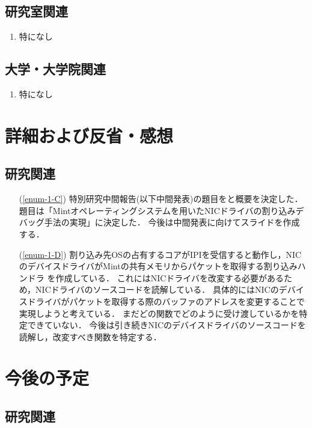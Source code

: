 \documentclass[fleqn, 14pt]{extarticle}
\begin{document}
\subsection{研究室関連}
\label{sec-2-2}
\begin{enumerate}
\item 特になし
\hfill
\end{enumerate}
\subsection{大学・大学院関連}
\label{sec-2-3}

\begin{enumerate}
\item 特になし
\hfill
\label{enum-univ2}
\end{enumerate}





\section{詳細および反省・感想}
\label{sec-3}
\subsection{研究関連}
\label{sec-3-1}

\begin{itemize}
\item[(\ref{enum-1-C})]
特別研究中間報告(以下中間発表)の題目をと概要を決定した．
題目は「Mintオペレーティングシステムを用いたNICドライバの割り込みデバッグ手法の実現」に決定した．
今後は中間発表に向けてスライドを作成する．
\item[(\ref{enum-1-D})]
割り込み先OSの占有するコアがIPIを受信すると動作し，NICのデバイスドライバがMintの共有メモリからパケットを取得する割り込みハンドラ
を作成している．
これにはNICドライバを改変する必要があるため，NICドライバのソースコードを読解している．
具体的にはNICのデバイスドライバがパケットを取得する際のバッファのアドレスを変更することで実現しようと考えている．
まだどの関数でどのように受け渡しているかを特定できていない．
今後は引き続きNICのデバイスドライバのソースコードを読解し，改変すべき関数を特定する．
\end{itemize}

\section{今後の予定}
\label{sec-4}
\subsection{研究関連}
\label{sec-4-1}
\end{document}
